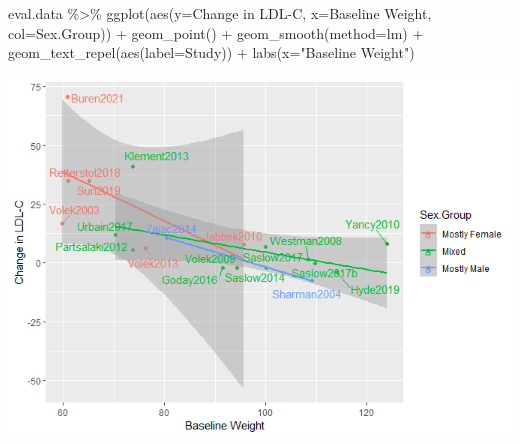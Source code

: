\documentclass[
]{article}
\newenvironment{Shaded}{\begin{snugshade}}{\end{snugshade}}
\newcommand{\AttributeTok}[1]{\textcolor[rgb]{0.77,0.63,0.00}{#1}}
\newcommand{\FunctionTok}[1]{\textcolor[rgb]{0.00,0.00,0.00}{#1}}
\newcommand{\NormalTok}[1]{#1}
\newcommand{\OtherTok}[1]{\textcolor[rgb]{0.56,0.35,0.01}{#1}}
\newcommand{\SpecialCharTok}[1]{\textcolor[rgb]{0.00,0.00,0.00}{#1}}
\newcommand{\StringTok}[1]{\textcolor[rgb]{0.31,0.60,0.02}{#1}}
\begin{document}
\begin{Shaded}
\begin{Highlighting}[]
\NormalTok{eval.data }\SpecialCharTok{\%\textgreater{}\%}
  \FunctionTok{ggplot}\NormalTok{(}\FunctionTok{aes}\NormalTok{(}\AttributeTok{y=}\StringTok{\textasciigrave{}}\AttributeTok{Change in LDL{-}C}\StringTok{\textasciigrave{}}\NormalTok{,}
             \AttributeTok{x=}\StringTok{\textasciigrave{}}\AttributeTok{Baseline Weight}\StringTok{\textasciigrave{}}\NormalTok{,}
             \AttributeTok{col=}\StringTok{\textasciigrave{}}\AttributeTok{Sex.Group}\StringTok{\textasciigrave{}}\NormalTok{)) }\SpecialCharTok{+}
  \FunctionTok{geom\_point}\NormalTok{() }\SpecialCharTok{+}
  \FunctionTok{geom\_smooth}\NormalTok{(}\AttributeTok{method=}\StringTok{\textquotesingle{}lm\textquotesingle{}}\NormalTok{) }\SpecialCharTok{+}
  \FunctionTok{geom\_text\_repel}\NormalTok{(}\FunctionTok{aes}\NormalTok{(}\AttributeTok{label=}\NormalTok{Study)) }\SpecialCharTok{+}
  \FunctionTok{labs}\NormalTok{(}\AttributeTok{x=}\StringTok{"Baseline Weight"}\NormalTok{)}
\end{Highlighting}
\end{Shaded}

\includegraphics{figures/ldl-change-vs-weight-6.png}

\begin{Shaded}
\end{Shaded}
\end{document}
